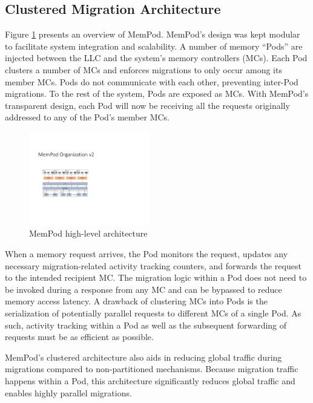 \subsection{Clustered Migration Architecture}

 Figure \ref{fig:architecture_complete} presents an overview of MemPod. MemPod's design was kept modular to facilitate system integration and scalability. A number of memory ``Pods'' are injected between the LLC and the system's memory controllers (MCs). Each Pod clusters a number of MCs and enforces migrations to only occur among its member MCs. Pods do not communicate with each other, preventing inter-Pod migrations. To the rest of the system, Pods are exposed as MCs. With MemPod's transparent design, each Pod will now be receiving all the requests originally addressed to any of the Pod's member MCs. 
 
\begin{figure}
 \includegraphics[width=0.47\textwidth]{figures/mempod_org.pdf}
 \caption{MemPod high-level architecture}
 \label{fig:architecture_complete}
\end{figure}

When a memory request arrives, the Pod monitors the request, updates any 
necessary migration-related activity tracking counters, and forwards 
the request to the intended recipient MC. The migration logic within a Pod does not need to be invoked during a response from any MC and can be bypassed to reduce memory access latency. A drawback of clustering MCs into Pods is the serialization of potentially parallel requests to different MCs of a single Pod. As such, activity tracking within a Pod as well as the subsequent forwarding of requests must be as efficient as possible. 

MemPod's clustered architecture also aids in reducing global traffic during migrations compared to non-partitioned mechanisms.  Because migration
traffic happens within a Pod, this architecture significantly reduces global
traffic and enables highly parallel migrations.

